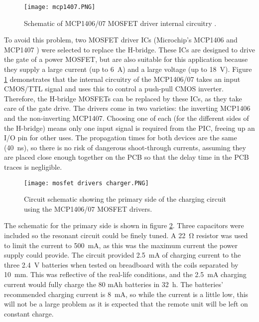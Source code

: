 \begin{figure}[htb]
	\centering
	\texttt{[image: mcp1407.PNG]}
	\caption{Schematic of MCP1406/07 MOSFET driver internal circuitry \cite{mcp1407}.}
	\label{fig: mcp1407}
\end{figure}

To avoid this problem, two MOSFET driver ICs (Microchip's MCP1406 and MCP1407 \cite{mcp1407}) were selected to replace the H-bridge. These ICs are designed to drive the gate of a power MOSFET, but are also suitable for this application because they supply a large current (up to \SI{6}{\ampere}) and a large voltage (up to \SI{18}{\volt}). Figure \ref{fig: mcp1407} demonstrates that the internal circuitry of the MCP1406/07 takes an input CMOS/TTL signal and uses this to control a push-pull CMOS inverter. Therefore, the H-bridge MOSFETs can be replaced by these ICs, as they take care of the gate drive. The drivers come in two varieties: the inverting MCP1406 and the non-inverting MCP1407. Choosing one of each (for the different sides of the H-bridge) means only one input signal is required from the PIC, freeing up an I/O pin for other uses. The propagation times for both devices are the same (\SI{40}{\nano\second}), so there is no risk of dangerous shoot-through currents, assuming they are placed close enough together on the PCB so that the delay time in the PCB traces is negligible.\\

\begin{figure}[htb]
	\centering
	\texttt{[image: mosfet drivers charger.PNG]}
	\caption{Circuit schematic showing the primary side of the charging circuit using the MCP1406/07 MOSFET drivers.}
	\label{fig: mosfet drivers charger}
\end{figure}

The schematic for the primary side is shown in figure \ref{fig: mosfet drivers charger}. Three capacitors were included so the resonant circuit could be finely tuned. A \SI{22}{\ohm} resistor was used to limit the current to \SI{500}{\milli\ampere}, as this was the maximum current the power supply could provide. The circuit provided \SI{2.5}{\milli\ampere} of charging current to the three \SI{2.4}{\volt} batteries when tested on breadboard with the coils separated by \SI{10}{\milli\metre}. This was reflective of the real-life conditions, and the \SI{2.5}{\milli\ampere} charging current would fully charge the 80 mAh batteries in \SI{32}{\hour}. The batteries' recommended charging current is \SI{8}{\milli\ampere}, so while the current is a little low, this will not be a large problem as it is expected that the remote unit will be left on constant charge.\\

